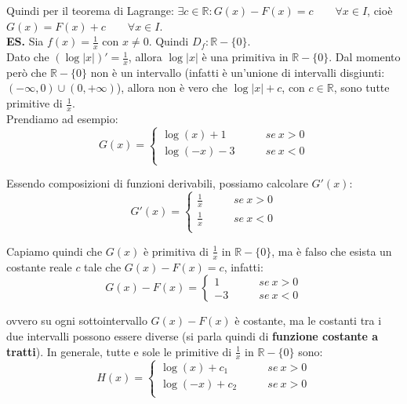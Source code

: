 \documentclass{article}
\begin{document}
\noindent Quindi per il teorema di Lagrange: $\exists c \in \mathbb{R} : G(x) - F(x) = c \qquad \forall x \in I$, cioè $G(x) = F(x) + c \qquad \forall x \in I$.\\

\noindent\textbf{ES.} Sia $f(x) = \frac{1}{x}$ con $x \neq 0$. Quindi $D_f: \mathbb{R} - \{0\}$.\\
Dato che $(\log|x|)' = \frac{1}{x}$, allora $\log|x|$ è una primitiva in $\mathbb{R} - \{0\}$. Dal momento però che $\mathbb{R} - \{0\}$ non è un intervallo (infatti è un'unione di intervalli disgiunti: $(-\infty, 0) \cup (0, +\infty)$), allora non è vero che $\log|x| + c$, con $c \in \mathbb{R}$, sono tutte primitive di $\frac{1}{x}$.\\
Prendiamo ad esempio: 
\begin{equation*}
    G(x) = \begin{cases}
        \log(x) + 1 & \qquad se \ x > 0\\
        \log(-x) - 3 & \qquad se \ x < 0\\
    \end{cases}
\end{equation*}

\noindent Essendo composizioni di funzioni derivabili, possiamo calcolare $G'(x)$:
\begin{equation*}
    G'(x) = \begin{cases}
        \frac{1}{x} & \qquad se \ x > 0\\
        \frac{1}{x} & \qquad se \ x < 0\\
    \end{cases}
\end{equation*}

\noindent Capiamo quindi che $G(x)$ è primitiva di $\frac{1}{x}$ in $\mathbb{R} - \{0\}$, ma è falso che esista un costante reale $c$ tale che $G(x) - F(x) = c$, infatti:
\begin{equation*}
    G(x) - F(x) = \begin{cases}
        1 & \qquad se \ x > 0 \\
        -3 & \qquad se \ x < 0
    \end{cases}
\end{equation*}

\noindent ovvero su ogni sottointervallo $G(x) - F(x)$ è costante, ma le costanti tra i due intervalli possono essere diverse (si parla quindi di \textbf{funzione costante a tratti}). In generale, tutte e sole le primitive di $\frac{1}{x}$ in $\mathbb{R} - \{0\}$ sono:
\begin{equation*}
    H(x) = \begin{cases}
        \log(x) + c_1 & \qquad se \ x > 0 \\
        \log(-x) + c_2 & \qquad se \ x > 0 \\
    \end{cases}
\end{equation*}
\end{document}
